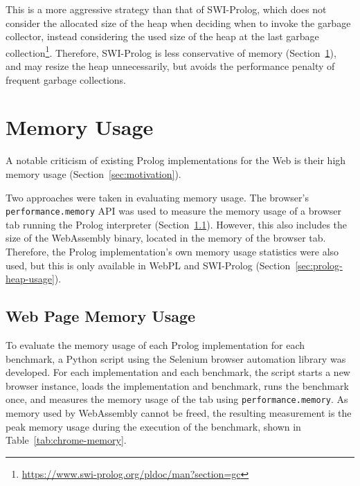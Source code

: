 This is a more aggressive strategy than that of SWI-Prolog, which does not consider the allocated size of the heap when deciding when to invoke the garbage collector, instead considering the used size of the heap at the last garbage collection\footnote{\url{https://www.swi-prolog.org/pldoc/man?section=gc}}. Therefore, SWI-Prolog is less conservative of memory (Section~\ref{sec:memory-usage}), and may resize the heap unnecessarily, but avoids the performance penalty of frequent garbage collections.

\section{Memory Usage}

\label{sec:memory-usage}

A notable criticism of existing Prolog implementations for the Web is their high memory usage (Section~\ref{sec:motivation}).

Two approaches were taken in evaluating memory usage. The browser's \texttt{performance.memory} API was used to measure the memory usage of a browser tab running the Prolog interpreter (Section~\ref{sec:web-page-memory-usage}). However, this also includes the size of the WebAssembly binary, located in the memory of the browser tab. Therefore, the Prolog implementation's own memory usage statistics were also used, but this is only available in WebPL and SWI-Prolog (Section~\ref{sec:prolog-heap-usage}).

\subsection{Web Page Memory Usage}

\label{sec:web-page-memory-usage}

To evaluate the memory usage of each Prolog implementation for each benchmark, a Python script using the Selenium browser automation library \cite{softwarefreedomconservancySeleniumhttpsgithubcom2025} was developed. For each implementation and each benchmark, the script starts a new browser instance, loads the implementation and benchmark, runs the benchmark once, and measures the memory usage of the tab using \texttt{performance.memory}. As memory used by WebAssembly cannot be freed, the resulting measurement is the peak memory usage during the execution of the benchmark, shown in Table~\ref{tab:chrome-memory}.

